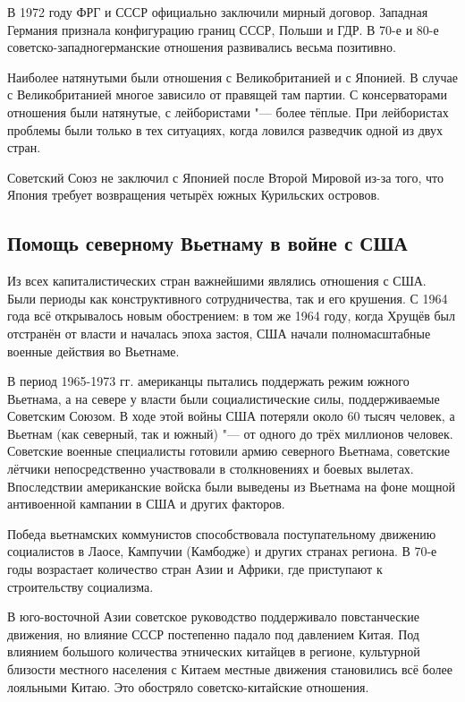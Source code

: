     В 1972 году ФРГ и СССР официально заключили мирный договор. Западная Германия признала конфигурацию границ СССР, Польши и ГДР. В 70-е и 80-е советско-западногерманские отношения развивались весьма позитивно.
    
    Наиболее натянутыми были отношения с Великобританией и с Японией. В случае с Великобританией многое зависило от правящей там партии. С консерваторами отношения были натянутые, с лейбористами "--- более тёплые. При лейбористах проблемы были только в тех ситуациях, когда ловился разведчик одной из двух стран.
    
    Советский Союз не заключил с Японией после Второй Мировой из-за того, что Япония требует возвращения четырёх южных Курильских островов.
    
    \subsection{Помощь северному Вьетнаму в войне с США}

    Из всех капиталистических стран важнейшими являлись отношения с США. Были периоды как конструктивного сотрудничества, так и его крушения. С 1964 года всё открывалось новым обострением: в том же 1964 году, когда Хрущёв был отстранён от власти и началась эпоха застоя, США начали полномасштабные военные действия во Вьетнаме.
  
    В период 1965-1973 гг. американцы пытались поддержать режим южного Вьетнама, а на севере у власти были социалистические силы, поддерживаемые Советским Союзом. В ходе этой войны США потеряли около 60 тысяч человек, а Вьетнам (как северный, так и южный) "--- от одного до трёх миллионов человек. Советские военные специалисты готовили армию северного Вьетнама, советские лётчики непосредственно участвовали в столкновениях и боевых вылетах. Впоследствии американские войска были выведены из Вьетнама на фоне мощной антивоенной кампании в США и других факторов.
    
    Победа вьетнамских коммунистов способствовала поступательному движению социалистов в Лаосе, Кампучии (Камбодже) и других странах региона. В 70-е годы возрастает количество стран Азии и Африки, где приступают к строительству социализма.
    
    В юго-восточной Азии советское руководство поддерживало повстанческие движения, но влияние СССР постепенно падало под давлением Китая. Под влиянием большого количества этнических китайцев в регионе, культурной близости местного населения с Китаем местные движения становились всё более лояльными Китаю. Это обостряло советско-китайские отношения.

